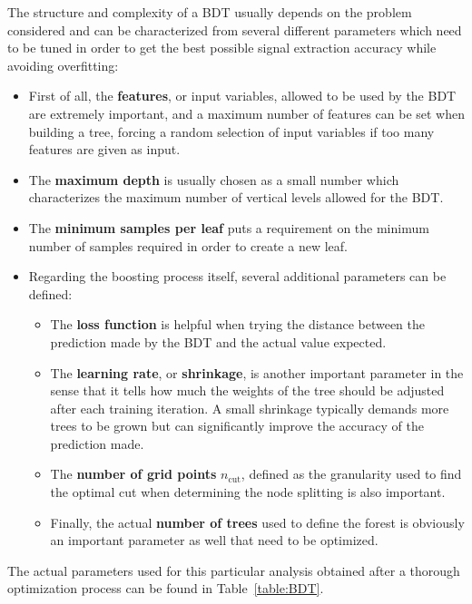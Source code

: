 \documentclass[a4paper, 10pt, openright]{report}
\begin{document}
The structure and complexity of a \ac{BDT} usually depends on the problem considered and can be characterized from several different parameters which need to be tuned in order to get the best possible signal extraction accuracy while avoiding overfitting:

\begin{itemize}
\item First of all, the \textbf{features}, or input variables, allowed to be used by the \ac{BDT} are extremely important, and a maximum number of features can be set when building a tree, forcing a random selection of input variables if too many features are given as input.
\item The \textbf{maximum depth} is usually chosen as a small number which characterizes the maximum number of vertical levels allowed for the \ac{BDT}.
\item The \textbf{minimum samples per leaf} puts a requirement on the minimum number of samples required in order to create a new leaf.
\item Regarding the boosting process itself, several additional parameters can be defined:

\begin{itemize}
\item The \textbf{loss function} is helpful when trying the distance between the prediction made by the \ac{BDT} and the actual value expected.
\item The \textbf{learning rate}, or \textbf{shrinkage}, is another important parameter in the sense that it tells how much the weights of the tree should be adjusted after each training iteration. A small shrinkage typically demands more trees to be grown but can significantly improve the accuracy of the prediction made.
\item The \textbf{number of grid points} $n_\text{cut}$, defined as the granularity used to find the optimal cut when determining the node splitting is also important.
\item Finally, the actual \textbf{number of trees} used to define the forest is obviously an important parameter as well that need to be optimized.
\end{itemize}

\end{itemize}

The actual parameters used for this particular analysis obtained after a thorough optimization process can be found in Table~\ref{table:BDT}.
\end{document}
